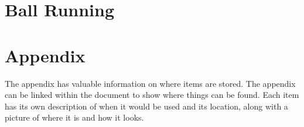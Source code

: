 \documentclass{article}
\begin{document}
\section{Ball Running}

\section{Appendix}
The appendix has valuable information on where items are stored. The appendix can be linked within the document to show where things can be found. Each item has its own description of when it would be used and its location, along with a picture of where it is and how it looks.
\end{document}
